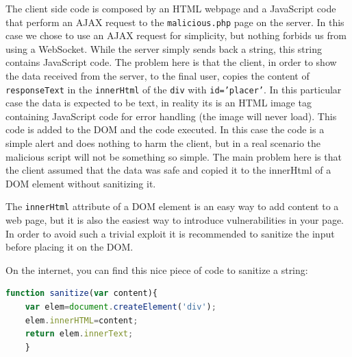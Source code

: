 The client side code is composed by an HTML webpage and a JavaScript code that perform an AJAX request to the \texttt{malicious.php} page on the server.\newline
In this case we chose to use an AJAX request for simplicity, but nothing forbids us from using a WebSocket.\newline
While the server simply sends back a string, this string contains JavaScript code.\newline
The problem here is that the client, in order to show the data received from the server, to the final user, copies the content of \texttt{responseText} in the \texttt{innerHtml} of the \texttt{div} with \texttt{id='placer'}.
In this particular case the data is expected to be text, in reality its is an HTML image tag containing JavaScript code for error handling (the image will never load). This code is added to the DOM and the code executed.\newline
In this case the code is a simple alert and does nothing to harm the client, but in a real scenario the malicious script will not be something so simple.\newline
The main problem here is that the client assumed that the data was safe and copied it to the innerHtml of a DOM element without sanitizing it.\newline

The \texttt{innerHtml} attribute of a DOM element is an easy way to add content to a web page, but it is also the easiest way to introduce vulnerabilities in your page.
In order to avoid such a trivial exploit it is recommended to sanitize the input before placing it on the DOM.\newline

On the internet, you can find this nice piece of code to sanitize a string:
\begin{lstlisting}[language=Javascript]
	function sanitize(var content){
	var elem=document.createElement('div');
	elem.innerHTML=content;
	return elem.innerText;
	}
\end{lstlisting}


